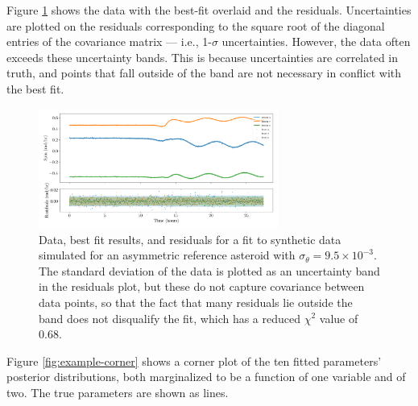 \documentclass{aastex631}
\begin{document}
Figure \ref{fig:example-residuals} shows the data with the best-fit overlaid and the residuals. Uncertainties are plotted on the residuals corresponding to the square root of the diagonal entries of the covariance matrix --- i.e., 1-$\sigma$ uncertainties. However, the data often exceeds these uncertainty bands. This is because uncertainties are correlated in truth, and points that fall outside of the band are not necessary in conflict with the best fit.

\begin{figure}
  \centering
  \includegraphics[width=0.7\textwidth]{example-residuals.pdf}
  \caption{Data, best fit results, and residuals for a fit to synthetic data simulated for an asymmetric reference asteroid with $\sigma_\theta = 9.5 \times 10^{-3}$. The standard deviation of the data is plotted as an uncertainty band in the residuals plot, but these do not capture covariance between data points, so that the fact that many residuals lie outside the band does not disqualify the fit, which has a reduced $\chi^2$ value of 0.68.}
  \label{fig:example-residuals}
\end{figure}

Figure \ref{fig:example-corner} shows a corner plot of the ten fitted parameters' posterior distributions, both marginalized to be a function of one variable and of two. The true parameters are shown as lines.
\end{document}
